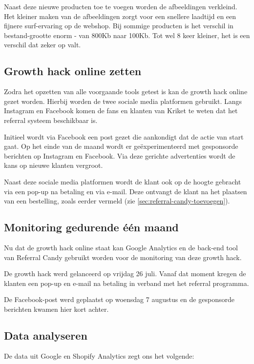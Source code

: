 Naast deze nieuwe producten toe te voegen worden de afbeeldingen verkleind. Het kleiner maken van de afbeeldingen zorgt voor een snellere laadtijd en een fijnere surf-ervaring op de webshop. Bij sommige producten is het verschil in bestand-grootte enorm - van 800Kb naar 100Kb. Tot wel 8 keer kleiner, het is een verschil dat zeker op valt.

\subsection{Growth hack online zetten} \label{sec:growth-hack-online-zetten}
Zodra het opzetten van alle voorgaande tools getest is kan de growth hack online gezet worden. Hierbij worden de twee sociale media platformen gebruikt. Langs Instagram en Facebook komen de fans en klanten van Kriket te weten dat het referral systeem beschikbaar is. 

Initieel wordt via Facebook een post gezet die aankondigt dat de actie van start gaat. Op het einde van de maand wordt er geëxperimenteerd met gesponsorde berichten op Instagram en Facebook. Via deze gerichte advertenties wordt de kans op nieuwe klanten vergroot.

Naast deze sociale media platformen wordt de klant ook op de hoogte gebracht via een pop-up na betaling en via e-mail. Deze ontvangt de klant na het plaatsen van een bestelling, zoals eerder vermeld (zie \ref{sec:referral-candy-toevoegen}). 

\subsection{Monitoring gedurende één maand} \label{sec:monitoring-gedurende-twee-weken}
Nu dat de growth hack online staat kan Google Analytics en de back-end tool van Referral Candy gebruikt worden voor de monitoring van deze growth hack. 

De growth hack werd gelanceerd op vrijdag 26 juli. Vanaf dat moment kregen de klanten een pop-up en e-mail na betaling in verband met het referral programma. 

De Facebook-post werd geplaatst op woensdag 7 augustus en de gesponsorde berichten kwamen hier kort achter.

\subsection{Data analyseren} \label{sec:data-analyseren}
De data uit Google en Shopify Analytics zegt ons het volgende:

